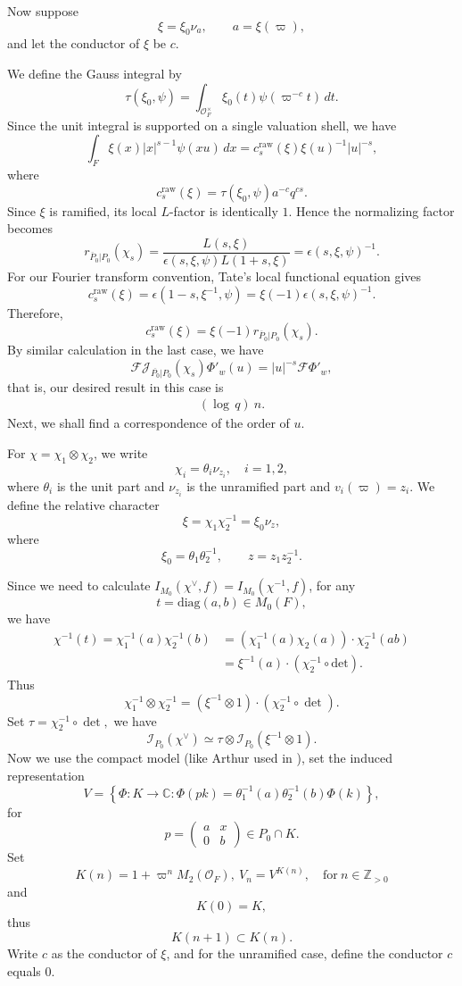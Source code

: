 \documentclass[11pt]{amsart}
\renewcommand{\rm}{\mathrm}
\theoremstyle{definition}
\numberwithin{equation}{section}
\begin{document}
	
	Now suppose
	\[
	\xi = \xi_0 \nu_a, \qquad a = \xi(\varpi), 
	\]and let the conductor of \(\xi\) be \(c\).
	
	
	We define the Gauss integral by
	\[
	\tau(\xi_0, \psi) = \int_{\mathcal{O}_F^\times} \xi_0(t) \psi(\varpi^{-c} t) \, dt.
	\]
	Since the unit integral is supported on a single valuation shell, we have
	\[
	\int_F \xi(x) |x|^{s-1} \psi(xu) \, dx = c_s^{\mathrm{raw}}(\xi) \xi(u)^{-1} |u|^{-s},
	\]
	where
	\[
	c_s^{\mathrm{raw}}(\xi) = \tau(\xi_0, \psi) a^{-c} q^{cs}.
	\]
	Since $\xi$ is ramified, its local $L$-factor is
identically $1$. Hence the normalizing factor becomes
\[
r_{\overline{P}_0|P_0}(\chi_s)
=
\frac{L(s,\xi)}
{\epsilon(s,\xi,\psi)L(1+s,\xi)}
=
\epsilon(s,\xi,\psi)^{-1}.
\]
For our Fourier transform convention, Tate's local
functional equation gives
\[
c_s^{\mathrm{raw}}(\xi)
=
\epsilon(1-s,\xi^{-1},\psi)
=
\xi(-1)\epsilon(s,\xi,\psi)^{-1}.
\]
Therefore,
\[
c_s^{\mathrm{raw}}(\xi)
=
\xi(-1)r_{\overline{P}_0|P_0}(\chi_s).
\]
	By similar calculation in the last case, we have \[\mathcal{F}\mathscr{J}_{\overline{P_0}|P_0}(\chi_s)\Phi'_w(u)=|u|^{-s}\mathcal{F}\Phi'_w,\]that is, our desired result in this case is
    \begin{align}\label{rami}
        (\log\,q)\ n.
    \end{align}
	Next, we shall find a correspondence of the order of \(u\).
	
	
	For \(\chi=\chi_1\otimes\chi_2\), we write
	\[
	\chi_i = \theta_i \nu_{z_i},\quad i=1,2,
	\]
	where \(\theta_i\) is the unit part and \(\nu_{z_i}\) is the unramified part and \(v_i(\varpi)=z_i\). We define the relative character
	\[
	\xi = \chi_1 \chi_2^{-1} = \xi_0 \nu_z,
	\]
	where
	\[
	\xi_0 = \theta_1 \theta_2^{-1}, \qquad z = z_1 z_2^{-1}.
	\]
	
	
	
	
	Since we need to calculate \(I_{M_0}(\chi^\vee,f)=I_{M_0}(\chi^{-1},f)\), for any \[t=\rm{diag}(a,b)\in M_0(F),\]we have  
	\begin{align*}
		\chi^{-1}(t)=\chi^{-1}_1(a)\chi^{-1}_2(b)&=(\chi_1^{-1}(a)\chi_2(a))\cdot\chi_2^{-1}(ab)\\
		&=\xi^{-1}(a)\cdot(\chi_2^{-1}\circ\rm{det}).
	\end{align*}
	Thus 
	\[\chi_1^{-1} \otimes \chi_2^{-1} = (\xi^{-1} \otimes 1) \cdot (\chi_2^{-1} \circ \det).\]
	Set \(\tau=\chi_2^{-1} \circ \det,\) we have\[\mathscr{I}_{P_0}(\chi^\vee)\simeq \tau\otimes\mathscr{I}_{P_0}(\xi^{-1} \otimes 1).\]
	Now we use the compact model (like Arthur used in \cite{Art81}), set the induced representation
	\[
	V= \left\{ \Phi : K \to \mathbb{C} : \Phi(pk) = \theta_1^{-1}(a)\theta_2^{-1}(b)\Phi(k) \right\},
	\]
	for
	\[
	p = \begin{pmatrix} a & x \\ 0 & b \end{pmatrix} \in P_0 \cap K.
	\]
	Set \[K(n)=1+\varpi^nM_2(\mathcal{O}_F),\  V_n=V^{K(n)},\quad \text{for}\ n\in \mathbb{Z}_{>0}\]and \[K(0)=K,\]
	thus \[K(n+1)\subset K(n).\]
	Write \(c\) as the conductor of \(\xi\), and for the unramified case, define the conductor \(c\) equals \(0\).
	
\end{document}
